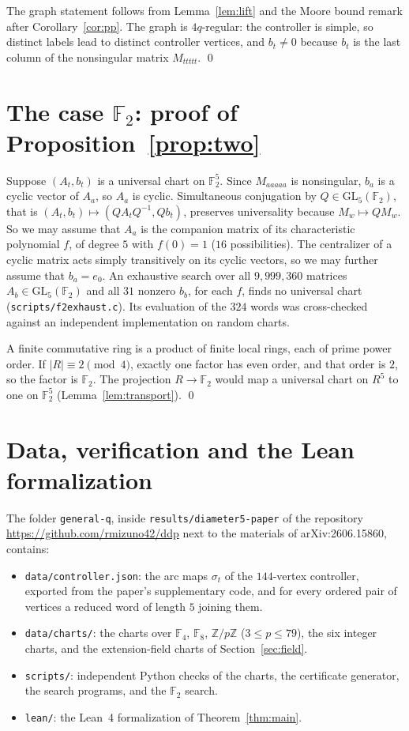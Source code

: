 \documentclass[11pt]{article}
\theoremstyle{definition}
\theoremstyle{remark}
\newcommand{\F}{\mathbb{F}}
\newcommand{\Z}{\mathbb{Z}}
\newcommand{\GL}{\mathrm{GL}}
\begin{document}
The graph statement follows from Lemma~\ref{lem:lift} and the Moore bound
remark after Corollary~\ref{cor:pp}. The graph is $4q$-regular: the
controller is simple, so distinct labels lead to distinct controller
vertices, and $b_t\ne 0$ because $b_t$ is the last column of the nonsingular
matrix $M_{ttttt}$. \qed

\section{The case $\F_2$: proof of Proposition~\ref{prop:two}}\label{sec:two}

Suppose $(A_t,b_t)$ is a universal chart on $\F_2^5$. Since $M_{aaaaa}$ is
nonsingular, $b_a$ is a cyclic vector of $A_a$, so $A_a$ is cyclic.
Simultaneous conjugation by $Q\in\GL_5(\F_2)$, that is
$(A_t,b_t)\mapsto(QA_tQ^{-1},Qb_t)$, preserves universality because
$M_w\mapsto QM_w$. So we may assume that $A_a$ is the companion matrix of its
characteristic polynomial $f$, of degree $5$ with $f(0)=1$ ($16$
possibilities). The centralizer of a cyclic matrix acts simply transitively on
its cyclic vectors, so we may further assume that $b_a=e_0$. An exhaustive
search over all $9{,}999{,}360$ matrices $A_b\in\GL_5(\F_2)$ and all $31$
nonzero $b_b$, for each $f$, finds no universal chart
(\texttt{scripts/f2exhaust.c}). Its evaluation of the $324$ words was
cross-checked against an independent implementation on random charts.

A finite commutative ring is a product of finite local rings, each of prime
power order. If $|R|\equiv 2\pmod 4$, exactly one factor has even order, and
that order is $2$, so the factor is $\F_2$. The projection $R\to\F_2$ would map
a universal chart on $R^5$ to one on $\F_2^5$ (Lemma~\ref{lem:transport}). \qed

\section{Data, verification and the Lean formalization}\label{sec:verify}\label{sec:lean}

The folder \texttt{general-q}, inside \texttt{results/diameter5-paper} of the
repository \url{https://github.com/rmizuno42/ddp} next to the materials of
arXiv:2606.15860, contains:

\begin{itemize}
\item \texttt{data/controller.json}: the arc maps $\sigma_t$ of the $144$-vertex
controller, exported from the paper's supplementary code, and for every
ordered pair of vertices a reduced word of length $5$ joining them.
\item \texttt{data/charts/}: the charts over $\F_4$, $\F_8$, $\Z/p\Z$
($3\le p\le 79$), the six integer charts, and the extension-field charts of
Section~\ref{sec:field}.
\item \texttt{scripts/}: independent Python checks of the charts, the
certificate generator, the search programs, and the $\F_2$ search.
\item \texttt{lean/}: the Lean~4 formalization of Theorem~\ref{thm:main}.
\end{itemize}
\end{document}
